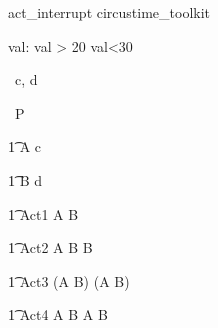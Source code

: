 \begin{zsection}
   \SECTION act\_interrupt \parents circustime\_toolkit
\end{zsection}


\begin{axdef}
   val: \nat
\where
   val > 20 \land val<30
\end{axdef}



\begin{circus}
   \circchannel\ c, d \\
\end{circus}

\begin{circus}
    \circprocess\ P \circdef \circbegin \\
\end{circus}


\begin{circusaction}
    	\t1 A \circdef c \then \Skip \\
\end{circusaction}

\begin{circusaction}
        \t1 B \circdef d \then \Skip \\
\end{circusaction}
        
\begin{circusaction}
        \t1 Act1 \circdef A   \rcirctime \circstartby B \\
\end{circusaction}
    
\begin{circusaction}     
	\t1 Act2 \circdef A   \rcirctime \circstartby B \circseq \circstartbyA  {} \rcirctime \circstartby B \\
\end{circusaction}
 
\begin{circusaction}
        \t1 Act3 \circdef (A   \rcirctime \circstartby B) \circseq (A   \rcirctime \circstartby B) \\
\end{circusaction}

\begin{circusaction}
	\t1 Act4 \circdef A   \rcirctime \circstartby B \extchoice A   \rcirctime \circstartby B \\
\end{circusaction}
 
